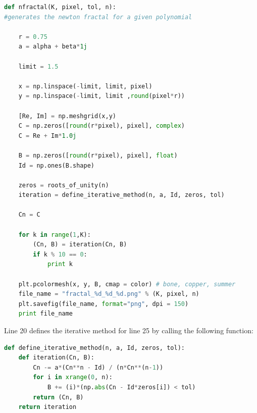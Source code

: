 \documentclass[12pt]{article}
\begin{document}
\begin{lstlisting}[language=Python, caption=Newton Fractal Function] 
def nfractal(K, pixel, tol, n):
#generates the newton fractal for a given polynomial

    r = 0.75
    a = alpha + beta*1j

    limit = 1.5

    x = np.linspace(-limit, limit, pixel)
    y = np.linspace(-limit, limit ,round(pixel*r))

    [Re, Im] = np.meshgrid(x,y)
    C = np.zeros([round(r*pixel), pixel], complex)
    C = Re + Im*1.0j

    B = np.zeros([round(r*pixel), pixel], float)
    Id = np.ones(B.shape)

    zeros = roots_of_unity(n)
    iteration = define_iterative_method(n, a, Id, zeros, tol)
    
    Cn = C
    
    for k in range(1,K):
        (Cn, B) = iteration(Cn, B)
        if k % 10 == 0:
            print k

    plt.pcolormesh(x, y, B, cmap = color) # bone, copper, summer
    file_name = "fractal_%d_%d_%d.png" % (K, pixel, n)
    plt.savefig(file_name, format="png", dpi = 150)
    print file_name
\end{lstlisting}
Line 20 defines the iterative method for line 25 by calling the following function:
\begin{lstlisting}[language=Python, caption=Definition of the Iterative Method]
def define_iterative_method(n, a, Id, zeros, tol):
    def iteration(Cn, B):
        Cn -= a*(Cn**n - Id) / (n*Cn**(n-1))
        for i in xrange(0, n):
            B += (i)*(np.abs(Cn - Id*zeros[i]) < tol)
        return (Cn, B)
    return iteration
\end{lstlisting}

\\

 \\
\end{document}
